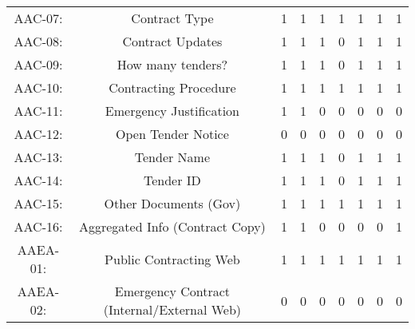 \documentclass[a4paper, twoside]{report}
\begin{document}
\begin{table}[htbp]
\begin{adjustbox}{max width=\linewidth}
\begin{tabular}{rcccccccc}
    \multicolumn{1}{c}{AAC-07:} & \multicolumn{1}{p{19em}}{Contract Type} & 1     & 1     & 1     & 1     & 1     & 1     & 1 \\
    \multicolumn{1}{c}{AAC-08:} & \multicolumn{1}{p{19em}}{Contract Updates} & 1     & 1     & 1     & 0     & 1     & 1     & 1 \\
    \multicolumn{1}{c}{AAC-09:} & \multicolumn{1}{p{19em}}{How many tenders?} & 1     & 1     & 1     & 0     & 1     & 1     & 1 \\
    \multicolumn{1}{c}{AAC-10:} & \multicolumn{1}{p{19em}}{\cellcolor[rgb]{ .749,  .749,  .749}Contracting Procedure} & \cellcolor[rgb]{ .749,  .749,  .749}1 & \cellcolor[rgb]{ .749,  .749,  .749}1 & \cellcolor[rgb]{ .749,  .749,  .749}1 & \cellcolor[rgb]{ .749,  .749,  .749}1 & \cellcolor[rgb]{ .749,  .749,  .749}1 & \cellcolor[rgb]{ .749,  .749,  .749}1 & \cellcolor[rgb]{ .749,  .749,  .749}1 \\
    \multicolumn{1}{c}{AAC-11:} & \multicolumn{1}{p{19em}}{\cellcolor[rgb]{ .749,  .749,  .749}Emergency Justification} & \cellcolor[rgb]{ .749,  .749,  .749}1 & \cellcolor[rgb]{ .749,  .749,  .749}1 & \cellcolor[rgb]{ .749,  .749,  .749}0 & \cellcolor[rgb]{ .749,  .749,  .749}0 & \cellcolor[rgb]{ .749,  .749,  .749}0 & \cellcolor[rgb]{ .749,  .749,  .749}0 & \cellcolor[rgb]{ .749,  .749,  .749}0 \\
    \multicolumn{1}{c}{AAC-12:} & \multicolumn{1}{p{19em}}{Open Tender Notice} & 0     & 0     & 0     & 0     & 0     & 0     & 0 \\
    \multicolumn{1}{c}{AAC-13:} & \multicolumn{1}{p{19em}}{Tender Name} & 1     & 1     & 1     & 0     & 1     & 1     & 1 \\
    \multicolumn{1}{c}{AAC-14:} & \multicolumn{1}{p{19em}}{Tender ID} & 1     & 1     & 1     & 0     & 1     & 1     & 1 \\
    \multicolumn{1}{c}{AAC-15:} & \multicolumn{1}{p{19em}}{Other Documents (Gov)} & 1     & 1     & 1     & 1     & 1     & 1     & 1 \\
    \multicolumn{1}{c}{AAC-16:} & \multicolumn{1}{p{19em}}{Aggregated Info (Contract Copy)} & 1     & 1     & 0     & 0     & 0     & 0     & 1 \\
    \midrule
    \multicolumn{1}{c}{AAEA-01:} & \multicolumn{1}{p{19em}}{Public Contracting Web} & 1     & 1     & 1     & 1     & 1     & 1     & 1 \\
    \multicolumn{1}{c}{AAEA-02:} & \multicolumn{1}{p{19em}}{\cellcolor[rgb]{ .749,  .749,  .749}Emergency Contract (Internal/External Web)} & \cellcolor[rgb]{ .749,  .749,  .749}0 & \cellcolor[rgb]{ .749,  .749,  .749}0 & \cellcolor[rgb]{ .749,  .749,  .749}0 & \cellcolor[rgb]{ .749,  .749,  .749}0 & \cellcolor[rgb]{ .749,  .749,  .749}0 & \cellcolor[rgb]{ .749,  .749,  .749}0 & \cellcolor[rgb]{ .749,  .749,  .749}0 \\

\end{tabular}
\end{adjustbox}
\end{table}
\end{document}
